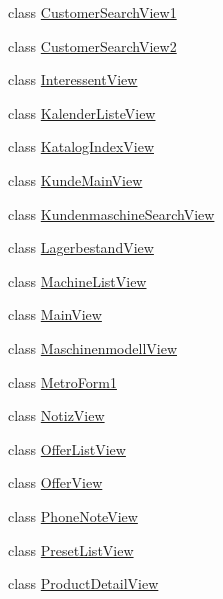 \begin{DoxyCompactItemize}
\item 
class \hyperlink{class_products_1_1_common_1_1_views_1_1_customer_search_view1}{Customer\+Search\+View1}
\item 
class \hyperlink{class_products_1_1_common_1_1_views_1_1_customer_search_view2}{Customer\+Search\+View2}
\item 
class \hyperlink{class_products_1_1_common_1_1_views_1_1_interessent_view}{Interessent\+View}
\item 
class \hyperlink{class_products_1_1_common_1_1_views_1_1_kalender_liste_view}{Kalender\+Liste\+View}
\item 
class \hyperlink{class_products_1_1_common_1_1_views_1_1_katalog_index_view}{Katalog\+Index\+View}
\item 
class \hyperlink{class_products_1_1_common_1_1_views_1_1_kunde_main_view}{Kunde\+Main\+View}
\item 
class \hyperlink{class_products_1_1_common_1_1_views_1_1_kundenmaschine_search_view}{Kundenmaschine\+Search\+View}
\item 
class \hyperlink{class_products_1_1_common_1_1_views_1_1_lagerbestand_view}{Lagerbestand\+View}
\item 
class \hyperlink{class_products_1_1_common_1_1_views_1_1_machine_list_view}{Machine\+List\+View}
\item 
class \hyperlink{class_products_1_1_common_1_1_views_1_1_main_view}{Main\+View}
\item 
class \hyperlink{class_products_1_1_common_1_1_views_1_1_maschinenmodell_view}{Maschinenmodell\+View}
\item 
class \hyperlink{class_products_1_1_common_1_1_views_1_1_metro_form1}{Metro\+Form1}
\item 
class \hyperlink{class_products_1_1_common_1_1_views_1_1_notiz_view}{Notiz\+View}
\item 
class \hyperlink{class_products_1_1_common_1_1_views_1_1_offer_list_view}{Offer\+List\+View}
\item 
class \hyperlink{class_products_1_1_common_1_1_views_1_1_offer_view}{Offer\+View}
\item 
class \hyperlink{class_products_1_1_common_1_1_views_1_1_phone_note_view}{Phone\+Note\+View}
\item 
class \hyperlink{class_products_1_1_common_1_1_views_1_1_preset_list_view}{Preset\+List\+View}
\item 
class \hyperlink{class_products_1_1_common_1_1_views_1_1_product_detail_view}{Product\+Detail\+View}
\item 

\end{DoxyCompactItemize}
